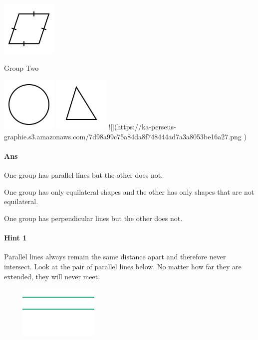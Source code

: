 \documentclass[twocolumn,10pt]{article}
\def\shrinkfactor{0.55}
\begin{document}
\includegraphics[scale=\shrinkfactor]{figures/5b842c6adbdf4de4dba70296479b1954a2362785.png}

Group Two


\includegraphics[scale=\shrinkfactor]{figures/9bf34a29bc62816f07057d9e571de844df484cd9.png} 
\includegraphics[scale=\shrinkfactor]{figures/ee7f87a00acb47dec4f2b2eed9a6741b21afc47d.png} ![](https://ka-perseus-graphie.s3.amazonaws.com/7d98a99c75a84da8f748444ad7a3a8053be16a27.png
)


\paragraph{Ans} 

One group has parallel lines but the other does not.

One group has only equilateral shapes and the other has only shapes that are not equilateral.


 One group has perpendicular lines but the other does not.



\paragraph{Hint 1}Parallel lines always remain the same distance apart and therefore never intersect.  Look at the pair of parallel lines below.  No matter how far they are extended, they will never meet.

$\phantom{xxxx}$
\includegraphics[scale=\shrinkfactor]{figures/7cf1fbfb7516a57d37ad80007a3886c81c33f393.png}  
\end{document}
